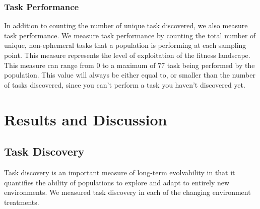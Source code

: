 \documentclass[PhD]{msu-thesis}
\begin{document}
\subsubsection{Task Performance}
In addition to counting the number of unique task discovered, we also measure task performance. We measure task performance by counting the total number of unique, non-ephemeral tasks that a population is performing at each sampling point. This measure represents the level of exploitation of the fitness landscape. This measure can range from 0 to a maximum of 77 task being performed by the population. This value will always be either equal to, or smaller than the number of tasks discovered, since you can't perform a task you haven't discovered yet.   

\section{Results and Discussion}

\subsection{Task Discovery}
Task discovery is an important measure of long-term evolvability in that it quantifies the ability of populations to explore and adapt to entirely new environments. We measured task discovery in each of the changing environment treatments.
\end{document}
